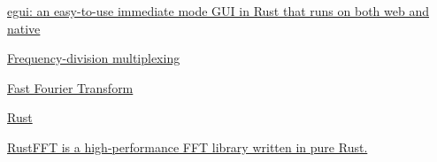 \documentclass{article}
\begin{document}
\begin{thebibliography}{9}
    \href{https://github.com/emilk/egui}{egui: an easy-to-use immediate mode GUI in Rust that runs on both web and native}

    \href{https://en.wikipedia.org/wiki/Frequency-division_multiplexing}{Frequency-division multiplexing}

    \href{https://en.wikipedia.org/wiki/Fast_Fourier_transform}{Fast Fourier Transform}

    \href{https://rust-lang.org}{Rust}

    \href{https://docs.rs/rustfft/latest/rustfft/}{RustFFT is a high-performance FFT library written in pure Rust.}
\end{thebibliography}
\end{document}
